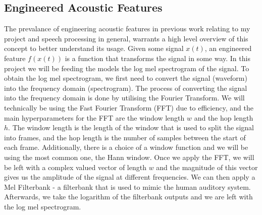 \documentclass[logo,bsc,singlespacing,parskip,online]{infthesis}
\begin{document}
\subsection{Engineered Acoustic Features}
The prevalance of engineering acoustic features in previous work relating to my project and speech processing in general,
warrants a high level overview of this concept to better understand its usage. 
Given some signal $x(t)$, an engineered feature $f(x(t))$ is a function that transforms the signal in some way.
In this project we will be feeding the models the log mel spectrogram of the signal. To obtain the log mel spectrogram, 
we first need to convert the signal (waveform) into the frequency domain (spectrogram).
The process of converting the signal into the frequency domain is done by utilising 
the Fourier Transform. We will technically be using the Fast Fourier Transform (FFT) 
due to efficiency, and the main hyperparameters for the FFT are the window length $w$ 
and the hop length $h$. The window length is the length of the window that is used to 
split the signal into frames, and the hop length is the number of samples between the 
start of each frame. Additionally, there is a choice of a window function and we will 
be using the most common one, the Hann window. Once we apply the FFT, we will be 
left with a complex valued vector of length $w$ and the magnitude of this vector 
gives us the amplitude of the signal at different frequencies. 
We can then apply a Mel Filterbank - a filterbank that is used to mimic the human auditory system. 
Afterwards, we take the logarithm of the filterbank outputs and we are left with the log mel spectrogram.

\end{document}
